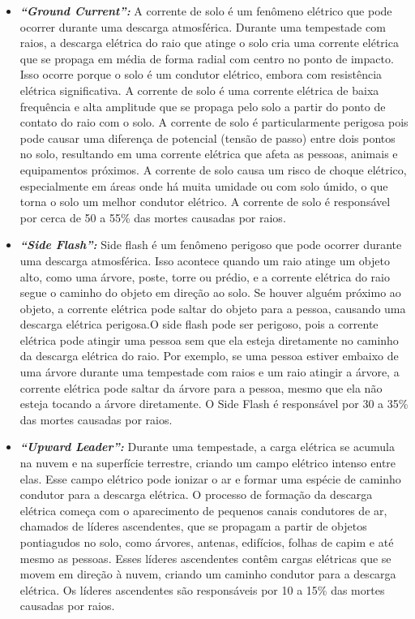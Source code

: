 \documentclass[a4paper, 12pt, onecolumn,singlespacing]{article}
\begin{document}
\begin{itemize}
		\begin{itemize}
			\item \textbf{\textit{``Ground Current'': }}A corrente de solo é um fenômeno elétrico que pode ocorrer durante uma descarga atmosférica. Durante uma tempestade com raios, a descarga elétrica do raio que atinge o solo cria uma corrente elétrica que se propaga em média de forma radial com centro no ponto de impacto. Isso ocorre porque o solo é um condutor elétrico, embora com resistência elétrica significativa. A corrente de solo é uma corrente elétrica de baixa frequência e alta amplitude que se propaga pelo solo a partir do ponto de contato do raio com o solo. A corrente de solo é particularmente perigosa  pois pode causar uma diferença de potencial (tensão de passo) entre dois pontos no solo, resultando em uma corrente elétrica que afeta as pessoas, animais e equipamentos próximos. A corrente de solo causa um risco de choque elétrico, especialmente em áreas onde há muita umidade ou com solo úmido, o que torna o solo um melhor condutor elétrico.
			A corrente de solo é responsável por cerca de 50 a 55\% das mortes causadas por raios.
			\item \textbf{\textit{``Side Flash'': }}Side flash é um fenômeno perigoso que pode ocorrer durante uma descarga atmosférica. Isso acontece quando um raio atinge um objeto alto, como uma árvore, poste, torre ou prédio, e a corrente elétrica do raio segue o caminho do objeto em direção ao solo. Se houver alguém próximo ao objeto, a corrente elétrica pode saltar do objeto para a pessoa, causando uma descarga elétrica perigosa.O side flash pode ser perigoso, pois a corrente elétrica pode atingir uma pessoa sem que ela esteja diretamente no caminho da descarga elétrica do raio. Por exemplo, se uma pessoa estiver embaixo de uma árvore durante uma tempestade com raios e um raio atingir a árvore, a corrente elétrica pode saltar da árvore para a pessoa, mesmo que ela não esteja tocando a árvore diretamente. O Side Flash é responsável por 30 a 35\% das mortes causadas por raios.
			
			\item \textbf{\textit{``Upward Leader'': }} Durante uma tempestade, a carga elétrica se acumula na nuvem e na superfície terrestre, criando um campo elétrico intenso entre elas. Esse campo elétrico pode ionizar o ar e formar uma espécie de caminho condutor para a descarga elétrica. O processo de formação da descarga elétrica começa com o aparecimento de pequenos canais condutores de ar, chamados de líderes ascendentes, que se propagam a partir de objetos pontiagudos no solo, como árvores, antenas, edifícios, folhas de capim e até mesmo as pessoas. Esses líderes ascendentes contêm cargas elétricas que se movem em direção à nuvem, criando um caminho condutor para a descarga elétrica. Os líderes ascendentes são responsáveis por 10 a 15\% das mortes causadas por raios.
			

\end{itemize}
\end{itemize}
\end{document}
